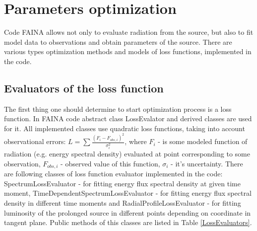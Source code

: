 \chapter{Parameters optimization}\label{optimization}
Code FAINA allows not only to evaluate radiation from the source, but also to fit model data to observations and obtain parameters of the source. There are various types optimization methods and models of loss functions, implemented in the code.

\section{Evaluators of the loss function}

The first thing one should determine to start optimization process is a loss function. In FAINA code abstract class LossEvalator and derived classes are used for it. All implemented classes use quadratic loss functions, taking into account observational errors:
$L = \sum \frac{(F_i - F_{obs,i})^2}{\sigma_i^2}$, where $F_i$ - is some modeled function of radiation (e.g. energy spectral density) evaluated at point corresponding to some observation, $F_{obs,i}$ - observed value of this function, $\sigma_i$ - it's uncertainty. There are following classes of loss function evaluator implemented in the code: SpectrumLossEvaluator - for fitting energy flux spectral density at given time moment, TimeDependentSpectrumLossEvaluator - for fitting energy flux spectral density in different time moments and RadialProfileLossEvaluator - for fitting luminosity of the prolonged source in different points depending on coordinate in tangent plane. Public methods of this classes are listed in Table \ref{LossEvaluators}.

